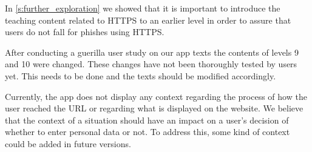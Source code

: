 \begin{description}[leftmargin=0cm]
	\item[Introduce HTTPS Earlier] In \autoref{s:further_exploration} we showed that it is important to introduce the teaching content related to HTTPS to an earlier level in order to assure that users do not fall for phishes using HTTPS.
	\item[Text Improvements:] After conducting a guerilla user study on our app texts the contents of levels 9 and 10 were changed. These changes have not been thoroughly tested by users yet.  This needs to be done and the texts should be modified accordingly. 
	\item[Add context:] Currently, the app does not display any context regarding the process of how the user reached the URL or regarding what is displayed on the website. We believe that the context of a situation should have an impact on a user's decision of whether to enter personal data or not. To address this, some kind of context could be added in future versions.
\end{description}

